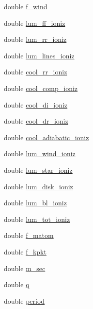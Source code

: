 \begin{DoxyCompactItemize}
\item 
double \hyperlink{structgeometry_a6d7e46da2dc9c222ac08c60d416dcd63}{f\+\_\+wind}
\item 
double \hyperlink{structgeometry_acb6781f4d383d99af45505d46f4084de}{lum\+\_\+ff\+\_\+ioniz}
\item 
double \hyperlink{structgeometry_abde7c45d81870a67bd2ac1126a528228}{lum\+\_\+rr\+\_\+ioniz}
\item 
double \hyperlink{structgeometry_a86b41ec449fc7d2f4ad5532de701481d}{lum\+\_\+lines\+\_\+ioniz}
\item 
double \hyperlink{structgeometry_ab5427d941546abbd887844d9d8c454b8}{cool\+\_\+rr\+\_\+ioniz}
\item 
double \hyperlink{structgeometry_a6421e78e4c1922edc8d8db92f4f58bf8}{cool\+\_\+comp\+\_\+ioniz}
\item 
double \hyperlink{structgeometry_a03ad5494da00808b0c30accc3ae14985}{cool\+\_\+di\+\_\+ioniz}
\item 
double \hyperlink{structgeometry_af38b024cd6a58bb82576d5766f08b554}{cool\+\_\+dr\+\_\+ioniz}
\item 
double \hyperlink{structgeometry_a2f26439a939e5204b627b2f254d64611}{cool\+\_\+adiabatic\+\_\+ioniz}
\item 
double \hyperlink{structgeometry_a55e4a3bbbfd77b3c28361c304fbf3f9c}{lum\+\_\+wind\+\_\+ioniz}
\item 
double \hyperlink{structgeometry_a2d755a63918d9ad1b454fadb61704ea8}{lum\+\_\+star\+\_\+ioniz}
\item 
double \hyperlink{structgeometry_a582d41699eec31287462c428fdddc794}{lum\+\_\+disk\+\_\+ioniz}
\item 
double \hyperlink{structgeometry_a1fb10589781d4853f13cebc8a3731de7}{lum\+\_\+bl\+\_\+ioniz}
\item 
double \hyperlink{structgeometry_a92919e08f4d71df33037c81013754c9d}{lum\+\_\+tot\+\_\+ioniz}
\item 
double \hyperlink{structgeometry_a9f2f7de2ab84764858a2bead77fd25f0}{f\+\_\+matom}
\item 
double \hyperlink{structgeometry_aee1ef1073728c7cec8e60640e26270ca}{f\+\_\+kpkt}
\item 
double \hyperlink{structgeometry_abf9100db4cbb5d3a0d8b540819d947df}{m\+\_\+sec}
\item 
double \hyperlink{structgeometry_a9add8f7045344c49daa6d2a8495152de}{q}
\item 
double \hyperlink{structgeometry_aeb6c26a04eb2ee8d029e2e151b42aada}{period}
\item 

\end{DoxyCompactItemize}

